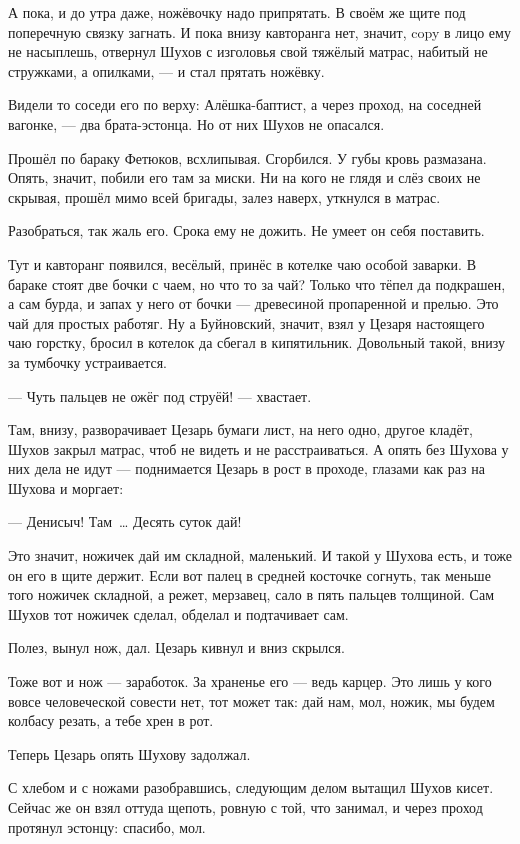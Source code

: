 А пока, и до утра даже, ножёвочку надо припрятать. В своём же щите под поперечную связку загнать. И пока внизу кавторанга нет, значит, copy в лицо ему не насыплешь, отвернул Шухов с изголовья свой тяжёлый матрас, набитый не стружками, а опилками, --- и стал прятать ножёвку.

Видели то соседи его по верху: Алёшка-баптист, а через проход, на соседней вагонке, --- два брата-эстонца. Но от них Шухов не опасался.

Прошёл по бараку Фетюков, всхлипывая. Сгорбился. У губы кровь размазана. Опять, значит, побили его там за миски. Ни на кого не глядя и слёз своих не скрывая, прошёл мимо всей бригады, залез наверх, уткнулся в матрас.

Разобраться, так жаль его. Срока ему не дожить. Не умеет он себя поставить.

Тут и кавторанг появился, весёлый, принёс в котелке чаю особой заварки. В бараке стоят две бочки с чаем, но что то за чай? Только что тёпел да подкрашен, а сам бурда, и запах у него от бочки --- древесиной пропаренной и прелью. Это чай для простых работяг. Ну а Буйновский, значит, взял у Цезаря настоящего чаю горстку, бросил в котелок да сбегал в кипятильник. Довольный такой, внизу за тумбочку устраивается.

--- Чуть пальцев не ожёг под струёй! --- хвастает.

Там, внизу, разворачивает Цезарь бумаги лист, на него одно, другое кладёт, Шухов закрыл матрас, чтоб не видеть и не расстраиваться. А опять без Шухова у них дела не идут --- поднимается Цезарь в рост в проходе, глазами как раз на Шухова и моргает:

--- Денисыч! Там~\dots{} Десять суток дай!

Это значит, ножичек дай им складной, маленький. И такой у Шухова есть, и тоже он его в щите держит. Если вот палец в средней косточке согнуть, так меньше того ножичек складной, а режет, мерзавец, сало в пять пальцев толщиной. Сам Шухов тот ножичек сделал, обделал и подтачивает сам.

Полез, вынул нож, дал. Цезарь кивнул и вниз скрылся.

Тоже вот и нож --- заработок. За храненье его --- ведь карцер. Это лишь у кого вовсе человеческой совести нет, тот может так: дай нам, мол, ножик, мы будем колбасу резать, а тебе хрен в рот.

Теперь Цезарь опять Шухову задолжал.

С хлебом и с ножами разобравшись, следующим делом вытащил Шухов кисет. Сейчас же он взял оттуда щепоть, ровную с той, что занимал, и через проход протянул эстонцу: спасибо, мол.

